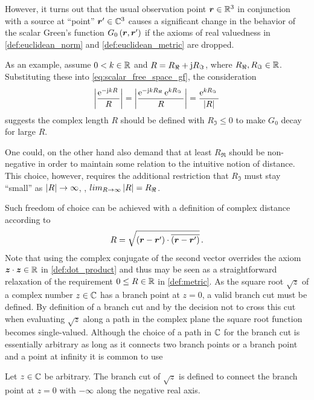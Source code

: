 However, it turns out that the usual observation point $\robs \in \R^3$ 
in conjunction with a source at \enquote{point} $\rsrc \in \C^3$
causes a significant change in the behavior of the scalar Green's function
$G_0 \left(\robs, \rsrc\right)$ if the axioms of real valuedness in
\cref{def:euclidean_norm} and \cref{def:euclidean_metric} are dropped.

As an example, assume $0 < k \in \mathbb{R}$ and
$R = R_\Re + \mathrm{j} R_\Im$, where
$R_\Re, R_\Im \in \mathbb{R}$.
Substituting these into \eqref{eq:scalar_free_space_gf}, the consideration
\begin{equation}\label{eq:example_csb}
	\left\vert\frac{\mathrm{e}^{-\mathrm{j} k R}\,}{R}\right\vert = 
	\left\vert \frac{\mathrm{e}^{-\mathrm{j} k R_\Re}\, \mathrm{e}^{k R_\Im}\,}{R} \right\vert = 
	\frac{\mathrm{e}^{k R_\Im}\,}{\left\vert R\right\vert}
\end{equation}
suggests the complex length $R$ should be defined with $R_\Im \leq 0$ to
make $G_0$ decay for large $R$.

One could, on the other hand also demand that at least $R_\Re$ should be
non-negative in order to maintain some relation to the intuitive notion of
distance.
This choice, however, requires the additional restriction that $R_\Im$
must stay \enquote{small} as $\left\vert R\right\vert \to \infty$, \ie,
$lim_{R \to \infty} \left\vert R\right\vert = R_\Re$.

Such freedom of choice can be achieved with a definition of complex distance
according to
\begin{equation}\label{eq:cmplx_length_undefined}
	R = \sqrt{\left(\rdiff\right) \cdot \overline{\left(\rdiff\right)}}
	\, .
\end{equation}
Note that using the complex conjugate of the second vector overrides the
axiom $\pvec{z} \cdot \pvec{z} \in \R$ in \cref{def:dot_product} and thus
may be seen as a straightforward relaxation of the requirement
$0 \leq R \in \mathbb{R}$ in \cref{def:metric}.
As the square root $\sqrt{z}$ of a complex number $z \in \mathbb{C}$ has a branch point
at $z = 0$, a valid branch cut must be defined.
By definition of a branch cut and by the decision not to cross this cut when
evaluating $\sqrt{z}$ along a path in the complex plane the square root function
becomes single-valued.
Although the choice of a path in $\mathbb{C}$ for the branch cut is essentially
arbitrary as long as it connects two branch points or a branch point and a
point at infinity it is common to use 
\cite[104]{Olver2010}\cite[\S\S2.2.3]{Chew1999}\cite[1066]{vanBladel2007}

\begin{definition}
	\label{def:sqrt_standard_branch_cut}
	Let $z \in \mathbb{C}$ be arbitrary.
	The branch cut of $\sqrt{z}$ is defined to connect the branch point at
	$z = 0$ with $-\infty$ along the negative real axis.
\end{definition}

